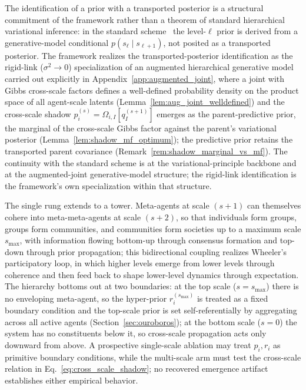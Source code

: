 \documentclass[11pt]{article}
\begin{document}
The identification of a prior with a transported posterior is a structural commitment of the framework rather than a theorem of standard hierarchical variational inference: in the standard scheme~\cite{Friston2017, parr2022active} the level-$\ell$ prior is derived from a generative-model conditional $p(s_\ell \mid s_{\ell+1})$, not posited as a transported posterior. The framework realizes the transported-posterior identification as the rigid-link ($\sigma^2 \to 0$) specialization of an augmented hierarchical generative model carried out explicitly in Appendix~\ref{app:augmented_joint}, where a joint with Gibbs cross-scale factors defines a well-defined probability density on the product space of all agent-scale latents (Lemma~\ref{lem:aug_joint_welldefined}) and the cross-scale shadow $p_i^{(s)} = \Omega_{i,I}[q_I^{(s+1)}]$ emerges as the parent-predictive prior, the marginal of the cross-scale Gibbs factor against the parent's variational posterior (Lemma~\ref{lem:shadow_mf_optimum}); the predictive prior retains the transported parent covariance (Remark~\ref{rem:shadow_marginal_vs_mf}). The continuity with the standard scheme is at the variational-principle backbone and at the augmented-joint generative-model structure; the rigid-link identification is the framework's own specialization within that structure.

The single rung extends to a tower. Meta-agents at scale $(s+1)$ can themselves cohere into meta-meta-agents at scale $(s+2)$, so that individuals form groups, groups form communities, and communities form societies up to a maximum scale $s_{\max}$, with information flowing bottom-up through consensus formation and top-down through prior propagation; this bidirectional coupling realizes Wheeler's participatory loop, in which higher levels emerge from lower levels through coherence and then feed back to shape lower-level dynamics through expectation. The hierarchy bottoms out at two boundaries: at the top scale ($s = s_{\max}$) there is no enveloping meta-agent, so the hyper-prior $r_i^{(s_{\max})}$ is treated as a fixed boundary condition and the top-scale prior is set self-referentially by aggregating across all active agents (Section~\ref{sec:ouroboros}); at the bottom scale ($s = 0$) the system has no constituents below it, so cross-scale propagation acts only downward from above. A prospective single-scale ablation may treat $p_i,r_i$ as primitive boundary conditions, while the multi-scale arm must test the cross-scale relation in Eq.~\eqref{eq:cross_scale_shadow}; no recovered emergence artifact establishes either empirical behavior.
\end{document}
